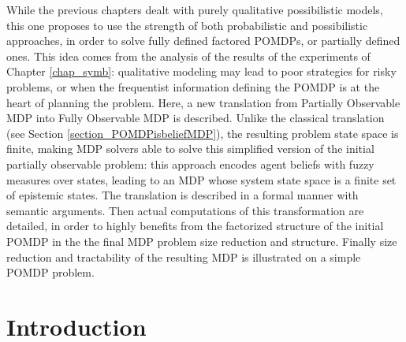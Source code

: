 While the previous chapters dealt with purely qualitative possibilistic models,
this one proposes to use the strength of both probabilistic and possibilistic approaches,
in order to solve fully defined factored POMDPs, or partially defined ones.
This idea comes from the analysis of the results of the experiments of Chapter \ref{chap_symb}:
qualitative modeling may lead to poor strategies 
for risky problems, or when the frequentist information defining the POMDP 
is at the heart of planning the problem. 
Here, a new translation from Partially Observable MDP into Fully 
Observable MDP is described. 
Unlike the classical
translation (see Section \ref{section_POMDPisbeliefMDP}), 
the resulting problem state space is finite, 
making MDP solvers able to solve this simplified version 
of the initial partially observable problem: this approach encodes 
agent beliefs with fuzzy measures over states, 
leading to an MDP whose system state space is a finite set of 
epistemic states. %
The translation is described in a formal manner with
semantic arguments. Then actual computations of this transformation
are detailed, in order to highly benefits from the factorized 
structure of the initial POMDP in the the final MDP problem 
size reduction and structure.
Finally size reduction and tractability of the resulting MDP is 
illustrated on a simple POMDP problem.

%

\section{Introduction}

